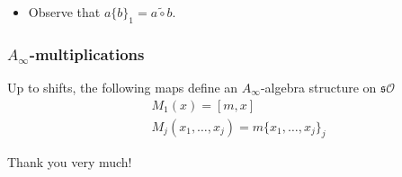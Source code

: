 \documentclass{beamer}
\theoremstyle{definition}
\begin{document}
\begin{frame}
\begin{itemize}
\item Observe that $a\{b\}_1=a\tilde{\circ} b$. 

\end{itemize}
\end{frame}

\begin{frame}
\frametitle{$A_\infty$-multiplications}
\begin{theorem}
Up to shifts, the following maps define an $A_\infty$-algebra structure on $\mathfrak{s}\mathcal{O}$\pause
\begin{align*}
&M_1(x)=[m,x]\\
&M_j(x_1,\dots, x_j)=m\{x_1,\dots, x_j\}_j
\end{align*}
\end{theorem}
\end{frame}
\begin{frame}
	\begin{center}
	\Huge{Thank you very much!}
\end{center}
\end{frame}

\end{document}
